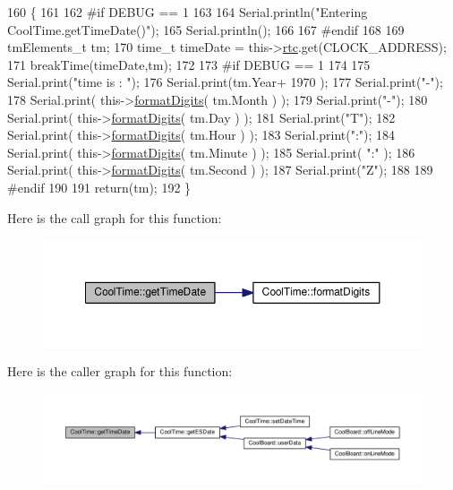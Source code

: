 \begin{DoxyCode}
160 \{
161 
162 \textcolor{preprocessor}{#if DEBUG == 1 }
163     
164     Serial.println(\textcolor{stringliteral}{"Entering CoolTime.getTimeDate()"});
165     Serial.println();
166 
167 \textcolor{preprocessor}{#endif}
168 
169     tmElements\_t tm;
170     time\_t timeDate = this->\hyperlink{classCoolTime_abd38f2384ff90692b1568d9db869412e}{rtc}.get(CLOCK\_ADDRESS);
171     breakTime(timeDate,tm);
172 
173 \textcolor{preprocessor}{#if DEBUG == 1}
174     
175     Serial.print(\textcolor{stringliteral}{"time is : "});
176     Serial.print(tm.Year+ 1970 );
177     Serial.print(\textcolor{stringliteral}{"-"});
178     Serial.print( this->\hyperlink{classCoolTime_acd537cd4210d7bde4e1f5c47d2ac0456}{formatDigits}( tm.Month ) );
179     Serial.print(\textcolor{stringliteral}{"-"});
180     Serial.print( this->\hyperlink{classCoolTime_acd537cd4210d7bde4e1f5c47d2ac0456}{formatDigits}( tm.Day ) );
181     Serial.print(\textcolor{stringliteral}{"T"});
182     Serial.print( this->\hyperlink{classCoolTime_acd537cd4210d7bde4e1f5c47d2ac0456}{formatDigits}( tm.Hour ) );
183     Serial.print(\textcolor{stringliteral}{":"});
184     Serial.print( this->\hyperlink{classCoolTime_acd537cd4210d7bde4e1f5c47d2ac0456}{formatDigits}( tm.Minute ) );
185     Serial.print( \textcolor{stringliteral}{":"} );
186     Serial.print( this->\hyperlink{classCoolTime_acd537cd4210d7bde4e1f5c47d2ac0456}{formatDigits}( tm.Second ) );
187     Serial.print(\textcolor{stringliteral}{"Z"});
188 
189 \textcolor{preprocessor}{#endif}
190     
191     \textcolor{keywordflow}{return}(tm);
192 \}
\end{DoxyCode}
Here is the call graph for this function\+:
\nopagebreak
\begin{figure}[H]
\begin{center}
\leavevmode
\includegraphics[width=350pt]{classCoolTime_a7a7501c5ca77dd1248bea704c44f986c_cgraph}
\end{center}
\end{figure}
Here is the caller graph for this function\+:
\nopagebreak
\begin{figure}[H]
\begin{center}
\leavevmode
\includegraphics[width=350pt]{classCoolTime_a7a7501c5ca77dd1248bea704c44f986c_icgraph}
\end{center}
\end{figure}
\mbox{\label{classCoolTime_a5ae038a4498602b189f76a10bf02adf8}} 
